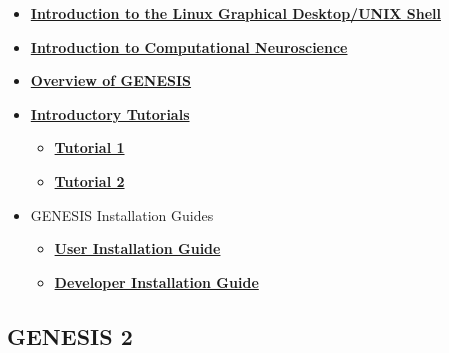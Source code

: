 \documentclass[12pt]{article}
\begin{document}
\begin{itemize}

   \item \href{../unix-linux/unix-linux.tex}{\bf Introduction to the Linux Graphical Desktop/UNIX Shell}

   \item \href{../compneurosci-1/compneurosci-1.tex}{\bf Introduction to Computational Neuroscience}

   \item \href{../genesis-overview/genesis-overview.tex}{\bf Overview of GENESIS}

   \item \href{../contents-level1/contents-level1.tex}{\bf Introductory Tutorials}
     \begin{itemize}
        \item \href{../tutorial1/tutorial1.tex}{\bf Tutorial 1}
       \item \href{../tutorial2/tutorial2.tex}{\bf Tutorial 2}
     \end{itemize}

   \item GENESIS Installation Guides
      \begin{itemize}
         \item \href{../installation-user/installation-user.tex}{\bf User Installation Guide}
         \item \href{../installation-developer/installation-developer.tex}{\bf Developer Installation Guide}
      \end{itemize}

\end{itemize}

\subsection*{GENESIS 2}
\end{document}
